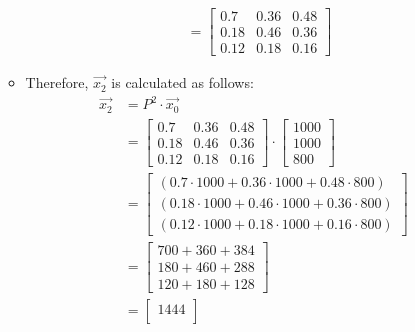 \documentclass{article}
\begin{document}
\begin{enumerate}[label = ({\alph*})]
\begin{itemize}
\begin{align}
                    &= \begin{bmatrix}
                    0.7 & 0.36 & 0.48 \\
                    0.18 & 0.46 & 0.36 \\
                    0.12 & 0.18 & 0.16
                    \end{bmatrix}
                    \end{align}
                    \item Therefore, \(\vec{x_2}\) is calculated as follows:
                    \begin{align*}
                    \vec{x_2} &= P^2 \cdot \vec{x_0} \\
                        &= \begin{bmatrix}
                            0.7 & 0.36 & 0.48 \\
                            0.18 & 0.46 & 0.36 \\
                            0.12 & 0.18 & 0.16
                        \end{bmatrix}
                        \cdot
                        \begin{bmatrix}
                            1000 \\
                            1000 \\
                            800
                        \end{bmatrix} \\
                        &= \begin{bmatrix}
                            (0.7 \cdot 1000 + 0.36 \cdot 1000 + 0.48 \cdot 800) \\
                            (0.18 \cdot 1000 + 0.46 \cdot 1000 + 0.36 \cdot 800) \\
                            (0.12 \cdot 1000 + 0.18 \cdot 1000 + 0.16 \cdot 800)
                        \end{bmatrix} \\
                        &= \begin{bmatrix}
                            700 + 360 + 384 \\
                            180 + 460 + 288 \\
                            120 + 180 + 128
                        \end{bmatrix} \\
                        &= \begin{bmatrix}
                            1444 \\

\end{bmatrix}
\end{align*}
\end{itemize}
\end{enumerate}
\end{document}
